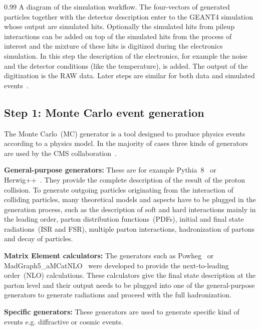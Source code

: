                  {0.99}       %
                 { A diagram of the simulation workflow. The four-vectors of generated particles together with the detector description enter to the GEANT4 simulation whose output are simulated hits. Optionally the simulated hits from pileup interactions can be added on top of the simulated hits from the process of interest and the mixture of these hits is digitized during the electronics simulation. In this step the description of the electronics, for example the noise and the detector conditions (like the temperature), is added. The output of the digitization is the RAW data. Later steps are similar for both data and simulated events~\cite{website:simuBasics}. }


\subsection{Step 1: Monte Carlo event generation}

The Monte Carlo~(MC) generator is a tool designed to produce physics events according to a physics model. In the majority of cases three kinds of generators are used by the CMS collaboration~\cite{website:generation, website:generationIntro}. 

\textbf{General-purpose generators: }
These are for example Pythia~8~\cite{Sjostrand:2014zea} or Herwig++~\cite{Bahr:2008pv}. They provide the complete description of the result of the proton collision. To generate outgoing particles originating from the interaction of colliding particles, many theoretical models and aspects have to be plugged in the generation process, such as the description of soft and hard interactions mainly in the leading order, parton distribution functions~(PDFs), initial and final state radiations~(ISR and FSR), multiple parton interactions, hadronization of partons and decay of particles.

\textbf{Matrix Element calculators: }
The generators such as Powheg~\cite{Oleari:2010nx} or MadGraph5\_aMCatNLO~\cite{Alwall:2014hca} were developed to provide the next-to-leading order~(NLO) calculations. These calculators give the final state description at the parton level and their output needs to be plugged into one of the general-purpose generators to generate radiations and proceed with the full hadronization.

\textbf{Specific generators: }
These generators are used to generate specific kind of events e.g. diffractive or cosmic events.

